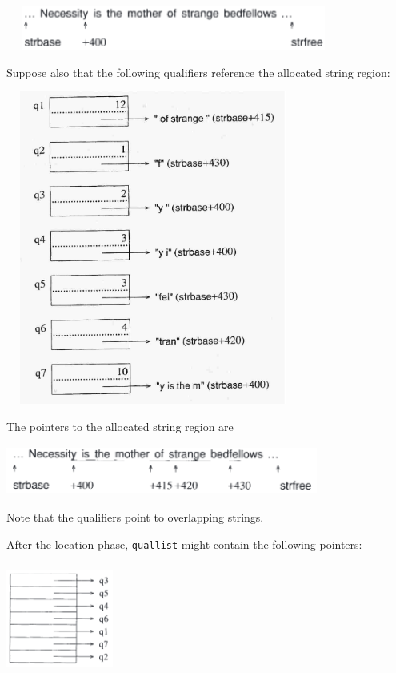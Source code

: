 \begin{center}
\includegraphics[width=4.3445in,height=0.5626in]{ib-img/ib-img095.png}

\end{center}

\bigskip

Suppose also that the following qualifiers reference the allocated
string region:


\ \  \includegraphics[width=3.5272in,height=4.0638in]{ib-img/ib-img096.jpg} 


The pointers to the allocated string region are



\begin{center}
\includegraphics[width=4.0425in,height=0.6374in]{ib-img/ib-img097.png}
\end{center}

Note that the qualifiers point to overlapping strings.


After the location phase, \texttt{quallist} might contain the
following pointers:


\begin{center}
\includegraphics[width=1.389in,height=1.4189in]{ib-img/ib-img098.png}
\end{center}


